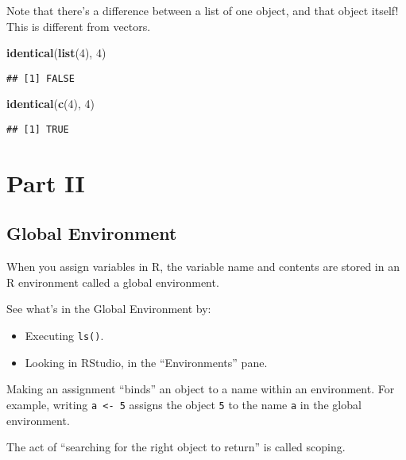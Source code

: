 \documentclass[]{article}
\newenvironment{Shaded}{\begin{snugshade}}{\end{snugshade}}
\newcommand{\KeywordTok}[1]{\textcolor[rgb]{0.13,0.29,0.53}{\textbf{#1}}}
\newcommand{\DecValTok}[1]{\textcolor[rgb]{0.00,0.00,0.81}{#1}}
\newcommand{\NormalTok}[1]{#1}
\providecommand{\tightlist}{%
  \setlength{\itemsep}{0pt}\setlength{\parskip}{0pt}}
\begin{document}
Note that there's a difference between a list of one object, and that
object itself! This is different from vectors.

\begin{Shaded}
\begin{Highlighting}[]
\KeywordTok{identical}\NormalTok{(}\KeywordTok{list}\NormalTok{(}\DecValTok{4}\NormalTok{), }\DecValTok{4}\NormalTok{)}
\end{Highlighting}
\end{Shaded}

\begin{verbatim}
## [1] FALSE
\end{verbatim}

\begin{Shaded}
\begin{Highlighting}[]
\KeywordTok{identical}\NormalTok{(}\KeywordTok{c}\NormalTok{(}\DecValTok{4}\NormalTok{), }\DecValTok{4}\NormalTok{)}
\end{Highlighting}
\end{Shaded}

\begin{verbatim}
## [1] TRUE
\end{verbatim}

\section{Part II}\label{part-ii}

\subsection{Global Environment}\label{global-environment}

When you assign variables in R, the variable name and contents are
stored in an R environment called a global environment.

See what's in the Global Environment by:

\begin{itemize}
\tightlist
\item
  Executing \texttt{ls()}.
\item
  Looking in RStudio, in the ``Environments'' pane.
\end{itemize}

Making an assignment ``binds'' an object to a name within an
environment. For example, writing \texttt{a\ \textless{}-\ 5} assigns
the object \texttt{5} to the name \texttt{a} in the global environment.

The act of ``searching for the right object to return'' is called
scoping.
\end{document}
